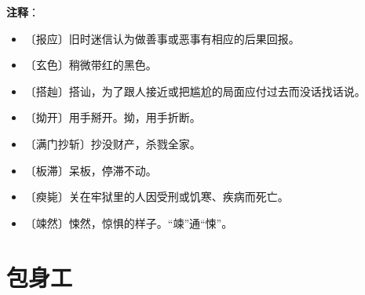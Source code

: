 \documentclass[12pt,UTF-8,openany]{ctexbook}
\begin{document}
\newpage

\textbf{注释}：

\vspace{-1em}

\begin{itemize}
    \setlength\itemsep{-0.2em}
    \item 〔报应〕旧时迷信认为做善事或恶事有相应的后果回报。
    \item 〔玄色〕稍微带红的黑色。
    \item 〔搭赸〕搭讪，为了跟人接近或把尴尬的局面应付过去而没话找话说。
    \item 〔拗开〕用手掰开。拗，用手折断。
    \item 〔满门抄斩〕抄没财产，杀戮全家。
    \item 〔板滞〕呆板，停滞不动。
    \item 〔瘐毙〕关在牢狱里的人因受刑或饥寒、疾病而死亡。
    \item 〔竦然〕悚然，惊惧的样子。“竦”通“悚”。
\end{itemize}

\chapter{包身工}
\end{document}
